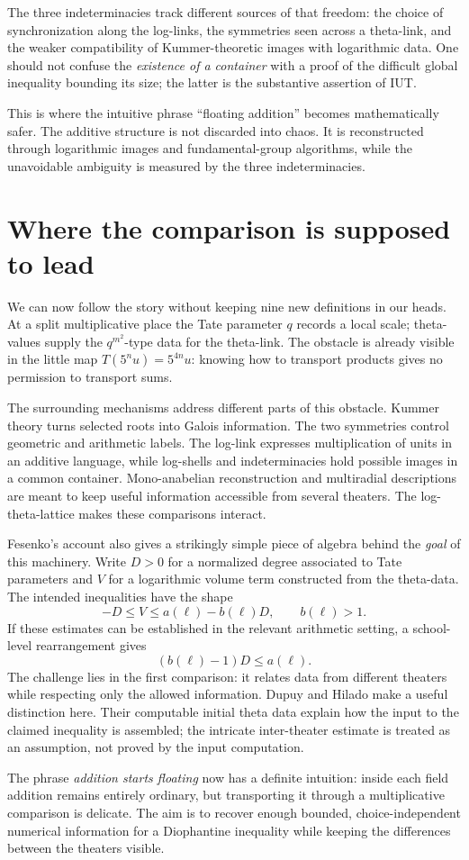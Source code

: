 The three indeterminacies track different sources of that freedom: the choice of synchronization along the log-links, the symmetries seen across a theta-link, and the weaker compatibility of Kummer-theoretic images with logarithmic data. One should not confuse the \emph{existence of a container} with a proof of the difficult global inequality bounding its size; the latter is the substantive assertion of IUT.

This is where the intuitive phrase ``floating addition'' becomes mathematically safer.  The additive structure is not discarded into chaos.  It is reconstructed through logarithmic images and fundamental-group algorithms, while the unavoidable ambiguity is measured by the three indeterminacies.

\section{Where the comparison is supposed to lead}

We can now follow the story without keeping nine new definitions in our heads. At a split multiplicative place the Tate parameter $q$ records a local scale; theta-values supply the $q^{m^2}$-type data for the theta-link. The obstacle is already visible in the little map $T(5^nu)=5^{4n}u$: knowing how to transport products gives no permission to transport sums.

The surrounding mechanisms address different parts of this obstacle. Kummer theory turns selected roots into Galois information. The two symmetries control geometric and arithmetic labels. The log-link expresses multiplication of units in an additive language, while log-shells and indeterminacies hold possible images in a common container. Mono-anabelian reconstruction and multiradial descriptions are meant to keep useful information accessible from several theaters. The log-theta-lattice makes these comparisons interact.

Fesenko's account also gives a strikingly simple piece of algebra behind the \emph{goal} of this machinery. Write $D>0$ for a normalized degree associated to Tate parameters and $V$ for a logarithmic volume term constructed from the theta-data. The intended inequalities have the shape
\[
 -D\le V\le a(\ell)-b(\ell)D,\qquad b(\ell)>1.
\]
If these estimates can be established in the relevant arithmetic setting, a school-level rearrangement gives
\[
 \boxed{(b(\ell)-1)D\le a(\ell).}
\]
The challenge lies in the first comparison: it relates data from different theaters while respecting only the allowed information. Dupuy and Hilado make a useful distinction here. Their computable initial theta data explain how the input to the claimed inequality is assembled; the intricate inter-theater estimate is treated as an assumption, not proved by the input computation.

The phrase \emph{addition starts floating} now has a definite intuition: inside each field addition remains entirely ordinary, but transporting it through a multiplicative comparison is delicate. The aim is to recover enough bounded, choice-independent numerical information for a Diophantine inequality while keeping the differences between the theaters visible.
